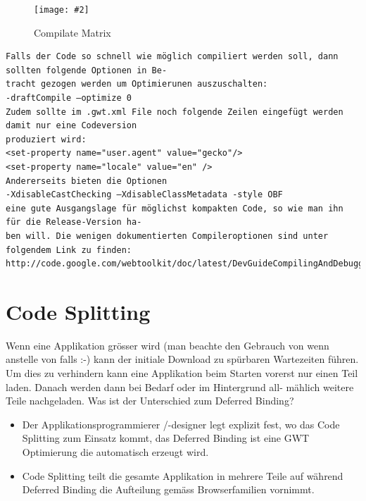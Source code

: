 \documentclass[a4paper,10pt]{scrreprt}
\newcommand{\pic}[2][figure]{\begin{figure}[h]
 \centering
 \texttt{[image: \#2]}
 \caption{#1}
\end{figure}
}
\begin{document}
\pic[Compilate Matrix]{cpm.png}
\newpage
\begin{lstlisting}[language={}]
 Falls der Code so schnell wie möglich compiliert werden soll, dann sollten folgende Optionen in Be-
tracht gezogen werden um Optimierunen auszuschalten:
-draftCompile –optimize 0
Zudem sollte im .gwt.xml File noch folgende Zeilen eingefügt werden damit nur eine Codeversion
produziert wird:
<set-property name="user.agent" value="gecko"/>
<set-property name="locale" value="en" />
Andererseits bieten die Optionen
-XdisableCastChecking –XdisableClassMetadata -style OBF
eine gute Ausgangslage für möglichst kompakten Code, so wie man ihn für die Release-Version ha-
ben will. Die wenigen dokumentierten Compileroptionen sind unter folgendem Link zu finden:
http://code.google.com/webtoolkit/doc/latest/DevGuideCompilingAndDebugging.html#DevGuideCompilerOptions.
\end{lstlisting}

\section{Code Splitting}
  Wenn eine Applikation grösser wird (man beachte den Gebrauch von wenn anstelle von falls :-) kann
der initiale Download zu spürbaren Wartezeiten führen. Um dies zu verhindern kann eine Applikation
beim Starten vorerst nur einen Teil laden. Danach werden dann bei Bedarf oder im Hintergrund all-
mählich weitere Teile nachgeladen.
Was ist der Unterschied zum Deferred Binding?
\begin{itemize}
\item Der Applikationsprogrammierer /-designer legt explizit fest, wo das Code Splitting zum Einsatz
kommt, das Deferred Binding ist eine GWT Optimierung die automatisch erzeugt wird.

\item Code Splitting teilt die gesamte Applikation in mehrere Teile auf während Deferred Binding die
Aufteilung gemäss Browserfamilien vornimmt.
\end{itemize}
\end{document}
